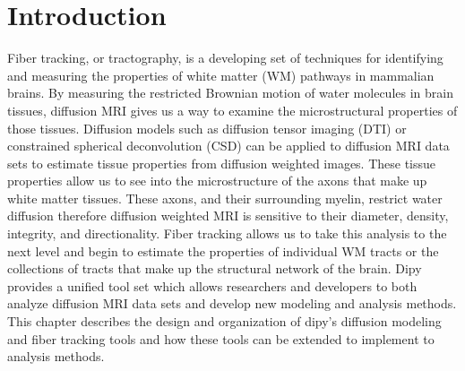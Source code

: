 \section{Introduction}
    Fiber tracking, or tractography, is a developing set of techniques for identifying and measuring the properties of white matter (WM) pathways in mammalian brains. By measuring the restricted Brownian motion of water molecules in brain tissues, diffusion MRI gives us a way to examine the microstructural properties of those tissues. Diffusion models such as diffusion tensor imaging (DTI) or constrained spherical deconvolution (CSD) can be applied to diffusion MRI data sets to estimate tissue properties from diffusion weighted images. These tissue properties allow us to see into the microstructure of the axons that make up white matter tissues. These axons, and their surrounding myelin, restrict water diffusion therefore diffusion weighted MRI is sensitive to their diameter, density, integrity, and directionality. Fiber tracking allows us to take this analysis to the next level and begin to estimate the properties of individual WM tracts or the collections of tracts that make up the structural network of the brain. Dipy provides a unified tool set which allows researchers and developers to both analyze diffusion MRI data sets and develop new modeling and analysis methods. This chapter describes the design and organization of dipy's diffusion modeling and fiber tracking tools and how these tools can be extended to implement to analysis methods.